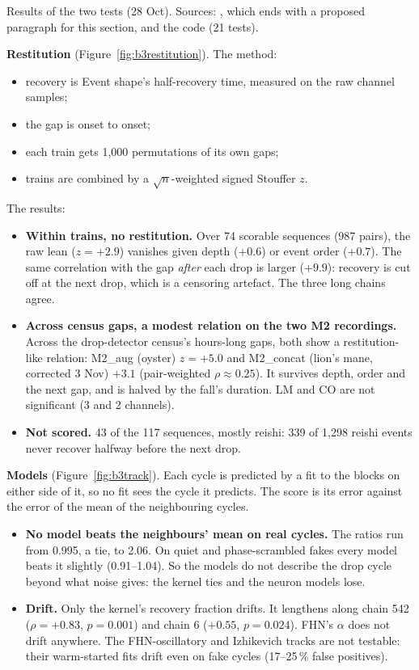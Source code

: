 \begin{instructions}
Results of the two tests (28 Oct). Sources: ,
which ends with a proposed paragraph for this section, and the code  (21 tests).

\textbf{Restitution} (Figure~\ref{fig:b3restitution}). The method:
\begin{itemize}
  \item recovery is Event shape's half-recovery time, measured on the raw channel samples;
  \item the gap is onset to onset;
  \item each train gets 1,000 permutations of its own gaps;
  \item trains are combined by a $\sqrt{n}$-weighted signed Stouffer $z$.
\end{itemize}
The results:
\begin{itemize}
  \item \textbf{Within trains, no restitution.} Over 74 scorable sequences (987 pairs), the raw lean ($z=+2.9$)
        vanishes given depth ($+0.6$) or event order ($+0.7$). The same correlation with the gap \emph{after} each
        drop is larger ($+9.9$): recovery is cut off at the next drop, which is a censoring artefact. The three long
        chains agree.
  \item \textbf{Across census gaps, a modest relation on the two M2 recordings.} Across the drop-detector census's
        hours-long gaps, both show a restitution-like relation: M2\_aug (oyster) $z=+5.0$ and M2\_concat (lion's mane,
        corrected 3 Nov) $+3.1$ (pair-weighted
        $\rho\approx0.25$). It survives depth, order and the next gap, and is halved by the fall's duration. LM and
        CO are not significant (3 and 2 channels).
  \item \textbf{Not scored.} 43 of the 117 sequences, mostly reishi: 339 of 1,298 reishi events never recover halfway
        before the next drop.
\end{itemize}

\textbf{Models} (Figure~\ref{fig:b3track}). Each cycle is predicted by a fit to the blocks on either side of it, so no
fit sees the cycle it predicts. The score is its error against the error of the mean of the neighbouring cycles.
\begin{itemize}
  \item \textbf{No model beats the neighbours' mean on real cycles.} The ratios run from 0.995, a tie, to 2.06. On
        quiet and phase-scrambled fakes every model beats it slightly (0.91--1.04). So the models do not describe the
        drop cycle beyond what noise gives: the kernel ties and the neuron models lose.
  \item \textbf{Drift.} Only the kernel's recovery fraction drifts. It lengthens along chain 542 ($\rho=+0.83$,
        $p=0.001$) and chain 6 ($+0.55$, $p=0.024$). FHN's $\alpha$ does not drift anywhere. The FHN-oscillatory
        and Izhikevich tracks are not testable: their warm-started fits drift even on fake cycles (17--25\,\% false
        positives).
\end{itemize}


\end{instructions}
